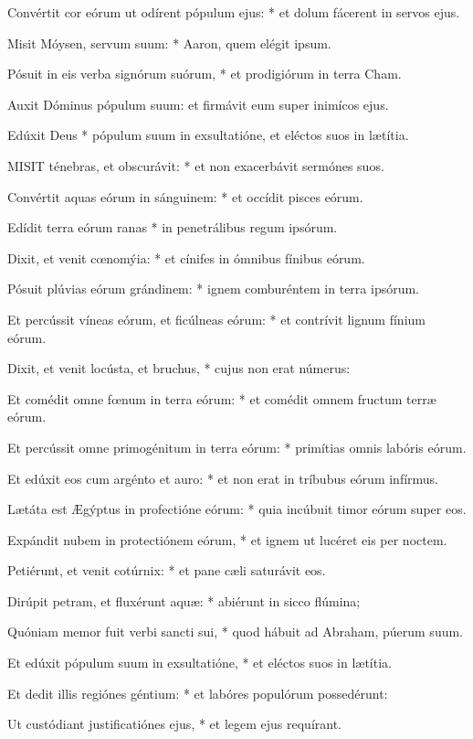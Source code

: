 Convértit cor eórum ut odírent pópulum ejus: * et dolum fácerent in servos ejus.

Misit Móysen, servum suum: * Aaron, quem elégit ipsum.

Pósuit in eis verba signórum suórum, * et prodigiórum in terra Cham.

 Auxit Dóminus pópulum suum: et firmávit eum super inimícos ejus.

 Edúxit Deus * pópulum suum in exsultatióne, et eléctos suos in lætítia.


\lettrine[lines=2]{M}{ISIT} ténebras, et obscurávit: * et non exacerbávit sermónes suos.

Convértit aquas eórum in sánguinem: * et occídit pisces eórum.

Edídit terra eórum ranas * in penetrálibus regum ipsórum.

Dixit, et venit cœnomýia: * et cínifes in ómnibus fínibus eórum.

Pósuit plúvias eórum grándinem: * ignem comburéntem in terra ipsórum.

Et percússit víneas eórum, et ficúlneas eórum: * et contrívit lignum fínium eórum.

Dixit, et venit locústa, et bruchus, * cujus non erat númerus:

Et comédit omne fœnum in terra eórum: * et comédit omnem fructum terræ eórum.

Et percússit omne primogénitum in terra eórum: * primítias omnis labóris eórum.

Et edúxit eos cum argénto et auro: * et non erat in tríbubus eórum infírmus.

Lætáta est Ægýptus in profectióne eórum: * quia incúbuit timor eórum super eos.

Expándit nubem in protectiónem eórum, * et ignem ut lucéret eis per noctem.

Petiérunt, et venit cotúrnix: * et pane cæli saturávit eos.

Dirúpit petram, et fluxérunt aquæ: * abiérunt in sicco flúmina;

Quóniam memor fuit verbi sancti sui, * quod hábuit ad Abraham, púerum suum.

Et edúxit pópulum suum in exsultatióne, * et eléctos suos in lætítia.

Et dedit illis regiónes géntium: * et labóres populórum possedérunt:

Ut custódiant justificatiónes ejus, * et legem ejus requírant.


